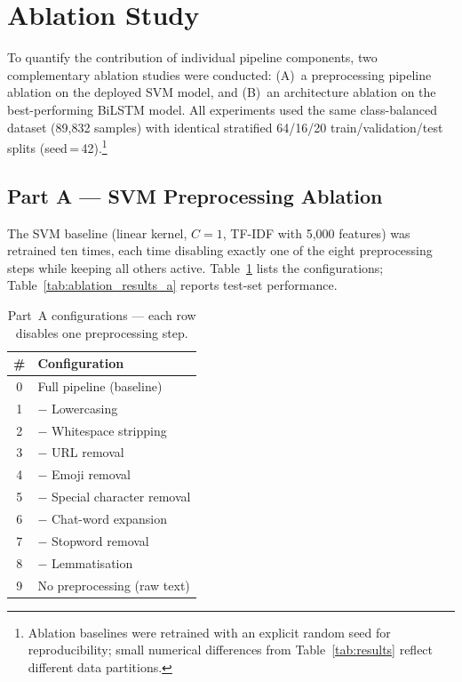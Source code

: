 \section{Ablation Study}
\label{sec:ablation}

To quantify the contribution of individual pipeline components, two complementary ablation studies were conducted: (A)~a preprocessing pipeline ablation on the deployed SVM model, and (B)~an architecture ablation on the best-performing BiLSTM model. All experiments used the same class-balanced dataset (89,832 samples) with identical stratified 64/16/20 train/validation/test splits (seed\,=\,42).\footnote{Ablation baselines were retrained with an explicit random seed for reproducibility; small numerical differences from Table~\ref{tab:results} reflect different data partitions.}

\subsection{Part A --- SVM Preprocessing Ablation}

The SVM baseline (linear kernel, $C = 1$, TF-IDF with 5,000 features) was retrained ten times, each time disabling exactly one of the eight preprocessing steps while keeping all others active. Table~\ref{tab:ablation_configs_a} lists the configurations; Table~\ref{tab:ablation_results_a} reports test-set performance.

\begin{table}[!htb]
\centering
\caption{Part~A configurations --- each row disables one preprocessing step.}
\label{tab:ablation_configs_a}
\small
\begin{tabular}{@{}cl@{}}
\toprule
\textbf{\#} & \textbf{Configuration} \\
\midrule
0 & Full pipeline (baseline) \\
1 & $-$ Lowercasing \\
2 & $-$ Whitespace stripping \\
3 & $-$ URL removal \\
4 & $-$ Emoji removal \\
5 & $-$ Special character removal \\
6 & $-$ Chat-word expansion \\
7 & $-$ Stopword removal \\
8 & $-$ Lemmatisation \\
9 & No preprocessing (raw text) \\
\bottomrule
\end{tabular}
\end{table}

